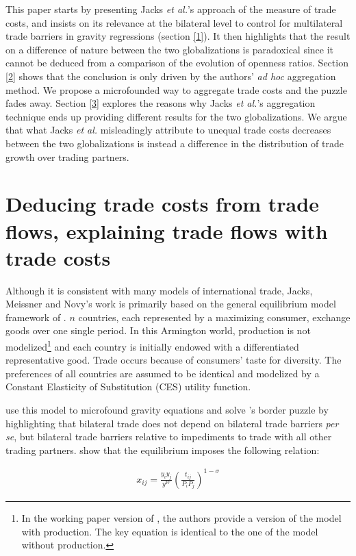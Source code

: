 \documentclass{article}
\begin{document}
This paper starts by presenting Jacks \textit{et al.}'s approach of the
measure of trade costs, and insists on its relevance at the
bilateral level to control for multilateral trade barriers in
gravity regressions (section \ref{1}). It then highlights that the
result on a difference of nature between the two globalizations
is paradoxical since it cannot be deduced from a comparison of the
evolution of openness ratios. Section \ref{2} shows that the
conclusion is only driven by the authors' \textit{ad hoc} aggregation
method. We propose a microfounded way to aggregate trade costs
and the puzzle fades away. Section \ref{3} explores the reasons
why Jacks \textit{et al.}'s aggregation technique ends up providing
different results for the two globalizations. We argue that
what Jacks \textit{et al.} misleadingly attribute to unequal trade costs
decreases between the two globalizations is instead a
difference in the distribution of trade growth over trading
partners.

\section{\label{1} Deducing trade costs from trade flows, explaining trade flows with trade costs}

Although it is consistent with many models of international
trade, Jacks, Meissner and Novy's work is primarily based on
the general equilibrium model framework of \cite{AW2003}. $n$
countries, each represented by a maximizing consumer, exchange
goods over one single period. In this Armington world,
production is not modelized\footnote{In the working paper
version of \cite{JMN2010}, the authors provide a version of the
model with production. The key equation is identical to the one
of the model without production.} and each country is initially
endowed with a differentiated representative good. Trade occurs
because of consumers' taste for diversity. The preferences of
all countries are assumed to be identical and modelized by a
Constant Elasticity of Substitution (CES) utility function.

\cite{AW2003} use this model to microfound gravity equations
and solve \cite{MAC}'s border puzzle by highlighting that
bilateral trade does not depend on bilateral trade barriers \textit{per
se}, but bilateral trade barriers relative to impediments to
trade with all other trading partners. \cite{AW2003} show that the
equilibrium imposes the following relation:

\begin{eqnarray}
x_{ij}=\frac{y_i y_j}{y^W}\left(\frac{t_{ij}}{P_i P_j}\right)^{1-\sigma}
\end{eqnarray}
\end{document}
